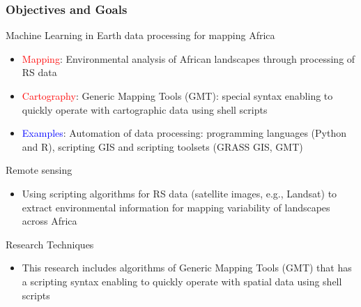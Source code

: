 \documentclass[pdflatex,compress,8pt,
	xcolor={dvipsnames,dvipsnames,svgnames,x11names,table},
	hyperref={colorlinks = true, breaklinks = true, urlcolor = NavyBlue, linkcolor=white, breaklinks = true}]{beamer}
\begin{document}
\begin{frame}\frametitle{Objectives and Goals}
 
\begin{alertblock}{Machine Learning in Earth data processing for mapping Africa}
\begin{itemize}
	\item \textcolor{red}{Mapping}: Environmental analysis of African landscapes through processing of RS data
	\item \textcolor{red}{Cartography}: Generic Mapping Tools (GMT): special syntax enabling to quickly operate with cartographic data using shell scripts
	\item \textcolor{blue}{Examples}: Automation of data processing: programming languages (Python and R), scripting GIS and scripting toolsets (GRASS GIS, GMT)
\end{itemize}
\end{alertblock}

\begin{exampleblock}{Remote sensing}
\begin{itemize}
        	\item Using scripting algorithms for RS data (satellite images, e.g., Landsat) to extract environmental information for mapping variability of landscapes across Africa
\end{itemize}
\end{exampleblock}
	
\begin{alertblock}{Research Techniques}
\begin{itemize}
	\item This research includes algorithms of Generic Mapping Tools (GMT) that has a scripting syntax enabling to quickly operate with spatial data using shell scripts
\end{itemize}
\end{alertblock}
\end{frame}

\end{document}
